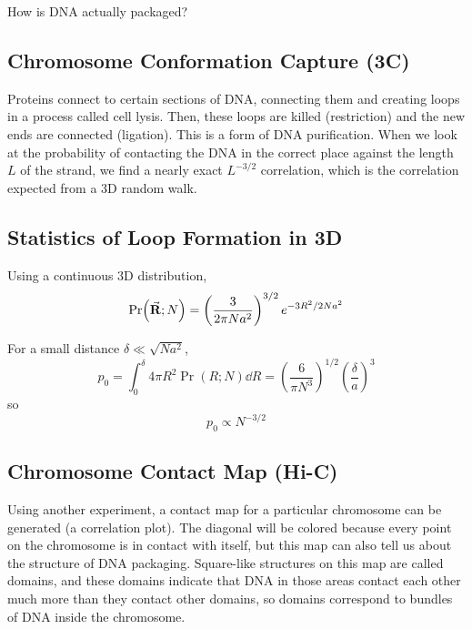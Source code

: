 \documentclass[a4paper,twoside,master.tex]{subfiles}
\begin{document}

How is DNA actually packaged?

\subsection{Chromosome Conformation Capture (3C)}\label{sub:chromosome_conformation_capture_(3c)}

Proteins connect to certain sections of DNA, connecting them and creating loops in a process called cell lysis. Then, these loops are killed (restriction) and the new ends are connected (ligation). This is a form of DNA purification. When we look at the probability of contacting the DNA in the correct place against the length $ L $ of the strand, we find a nearly exact $ L^{-3/2} $ correlation, which is the correlation expected from a 3D random walk.

\subsection{Statistics of Loop Formation in 3D}\label{sub:statistics_of_loop_formation_in_3d}

Using a continuous 3D distribution,
\begin{equation}
    \Pr(\va{R} ; N) = \left( \frac{3}{2 \pi N a^2} \right)^{3/2} e^{-3R^2 / 2Na^2}
\end{equation}

For a small distance $ \delta \ll \sqrt{N a^2} $,
\begin{equation}
    p_0 = \int_0^{\delta} 4 \pi R^2 \Pr(R;N) \dd{R} = \left( \frac{6}{\pi N^3} \right)^{1/2} \left( \frac{\delta}{a} \right)^3
\end{equation}
so
\begin{equation}
    p_0 \propto N^{-3/2}
\end{equation}

\subsection{Chromosome Contact Map (Hi-C)}\label{sub:chromosome_contact_map_(hi-c)}

Using another experiment, a contact map for a particular chromosome can be generated (a correlation plot). The diagonal will be colored because every point on the chromosome is in contact with itself, but this map can also tell us about the structure of DNA packaging. Square-like structures on this map are called domains, and these domains indicate that DNA in those areas contact each other much more than they contact other domains, so domains correspond to bundles of DNA inside the chromosome.
\end{document}
